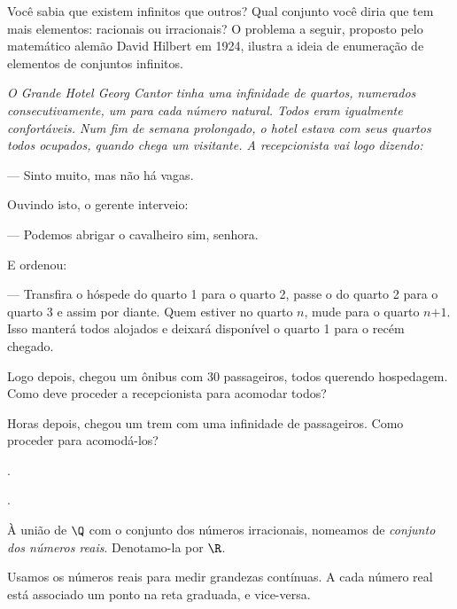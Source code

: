 {
	\noindent Você sabia que existem infinitos  que outros? Qual conjunto você diria que tem mais elementos: racionais ou irracionais? O problema a seguir, proposto pelo matemático alemão David Hilbert em 1924, ilustra a ideia de enumeração de elementos de conjuntos infinitos.

	{\itshape O Grande Hotel Georg Cantor tinha uma infinidade de quartos, numerados consecutivamente, um para cada número natural. Todos eram igualmente confortáveis. Num fim de semana prolongado, o hotel estava com seus quartos todos ocupados, quando chega um visitante. A recepcionista vai logo dizendo: 

	--- Sinto muito, mas não há vagas. 

	Ouvindo isto, o gerente interveio: 

	--- Podemos abrigar o cavalheiro sim, senhora. 

	E ordenou:

	--- Transfira o hóspede do quarto 1 para o quarto 2, passe o do quarto 2 para o quarto 3 e assim por diante. Quem estiver no quarto $n$, mude para o quarto $\textit{n+1}$. Isso manterá todos alojados e deixará disponível o quarto 1 para o recém chegado.

	Logo depois, chegou um ônibus com 30 passageiros, todos querendo hospedagem. Como deve proceder a recepcionista para acomodar todos? 

	Horas depois, chegou um trem com uma infinidade de passageiros. Como proceder para acomodá-los?}
}

\begin{onlineact}
	.
\end{onlineact}

\begin{onlineact}
	.
\end{onlineact}

\begin{definition}
	À união de $\Q$ com o conjunto dos números irracionais, nomeamos de \emph{conjunto dos números reais}. Denotamo-la por $\R$.
\end{definition}

Usamos os números reais para medir grandezas contínuas. A cada número real está associado um ponto na reta graduada, e vice-versa. 

